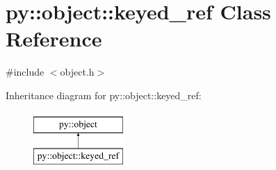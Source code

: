 \hypertarget{classpy_1_1object_1_1keyed__ref}{}\section{py\+:\+:object\+:\+:keyed\+\_\+ref Class Reference}
\label{classpy_1_1object_1_1keyed__ref}


{\ttfamily \#include $<$object.\+h$>$}

Inheritance diagram for py\+:\+:object\+:\+:keyed\+\_\+ref\+:\begin{figure}[H]
\begin{center}
\leavevmode
\includegraphics[height=2.000000cm]{classpy_1_1object_1_1keyed__ref}
\end{center}
\end{figure}

